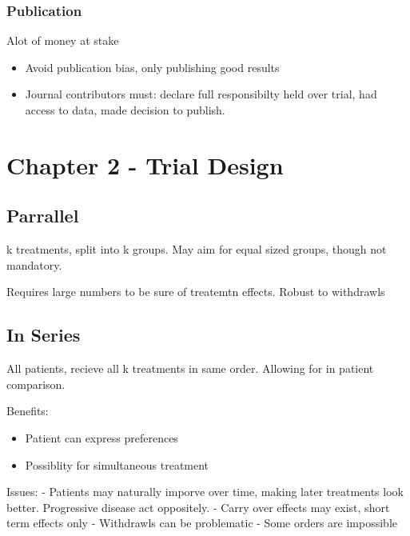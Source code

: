 \documentclass[
  letterpaper,
  DIV=11,
  numbers=noendperiod]{scrreprt}
\providecommand{\tightlist}{%
  \setlength{\itemsep}{0pt}\setlength{\parskip}{0pt}}\usepackage{longtable,booktabs,array}
\begin{document}
\hypertarget{publication}{%
\subsubsection{Publication}\label{publication}}

Alot of money at stake

\begin{itemize}
\tightlist
\item
  Avoid publication bias, only publishing good results
\item
  Journal contributors must: declare full responsibilty held over trial,
  had access to data, made decision to publish.
\end{itemize}

\hypertarget{chapter-2---trial-design}{%
\section{Chapter 2 - Trial Design}\label{chapter-2---trial-design}}

\hypertarget{parrallel}{%
\subsection{Parrallel}\label{parrallel}}

k treatments, split into k groups. May aim for equal sized groups,
though not mandatory.

Requires large numbers to be sure of treatemtn effects. Robust to
withdrawls

\hypertarget{in-series}{%
\subsection{In Series}\label{in-series}}

All patients, recieve all k treatments in same order. Allowing for in
patient comparison.

Benefits:

\begin{itemize}
\tightlist
\item
  Patient can express preferences
\item
  Possiblity for simultaneous treatment
\end{itemize}

Issues: - Patients may naturally imporve over time, making later
treatments look better. Progressive disease act oppositely. - Carry over
effects may exist, short term effects only - Withdrawls can be
problematic - Some orders are impossible
\end{document}
